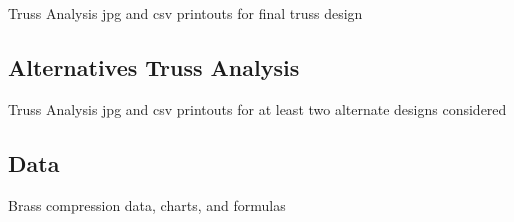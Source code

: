 \documentclass{article}
\let\Oldsubsection\subsection
\renewcommand{\subsection}{\FloatBarrier\Oldsubsection}
\begin{document}
  Truss Analysis jpg and csv printouts for final truss design

  \newpage

  \subsection{Alternatives Truss Analysis}

  Truss Analysis jpg and csv printouts for at least two alternate designs considered

  \newpage

  \subsection{Data}

  Brass compression data, charts, and formulas

  \newpage

  \printbibliography

  
\end{document}
